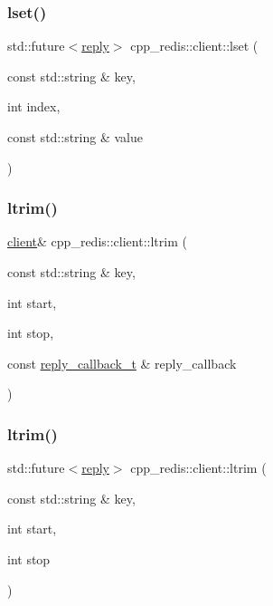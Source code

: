 \subsubsection{\texorpdfstring{lset()}{lset()}\hspace{0.1cm}{\footnotesize\ttfamily [2/2]}}
{\footnotesize\ttfamily std\+::future$<$\hyperlink{classcpp__redis_1_1reply}{reply}$>$ cpp\+\_\+redis\+::client\+::lset (\begin{DoxyParamCaption}\item[{const std\+::string \&}]{key,  }\item[{int}]{index,  }\item[{const std\+::string \&}]{value }\end{DoxyParamCaption})}

\mbox{\label{classcpp__redis_1_1client_af82304129513a073988583fcfa4210fe}} 
\subsubsection{\texorpdfstring{ltrim()}{ltrim()}\hspace{0.1cm}{\footnotesize\ttfamily [1/2]}}
{\footnotesize\ttfamily \hyperlink{classcpp__redis_1_1client}{client}\& cpp\+\_\+redis\+::client\+::ltrim (\begin{DoxyParamCaption}\item[{const std\+::string \&}]{key,  }\item[{int}]{start,  }\item[{int}]{stop,  }\item[{const \hyperlink{classcpp__redis_1_1client_a061a1140d36d2eaeda82b09a0bb3f9f2}{reply\+\_\+callback\+\_\+t} \&}]{reply\+\_\+callback }\end{DoxyParamCaption})}

\mbox{\label{classcpp__redis_1_1client_af14f81093a0e6e45d958e9b7a5ed9c16}} 
\subsubsection{\texorpdfstring{ltrim()}{ltrim()}\hspace{0.1cm}{\footnotesize\ttfamily [2/2]}}
{\footnotesize\ttfamily std\+::future$<$\hyperlink{classcpp__redis_1_1reply}{reply}$>$ cpp\+\_\+redis\+::client\+::ltrim (\begin{DoxyParamCaption}\item[{const std\+::string \&}]{key,  }\item[{int}]{start,  }\item[{int}]{stop }\end{DoxyParamCaption})}

